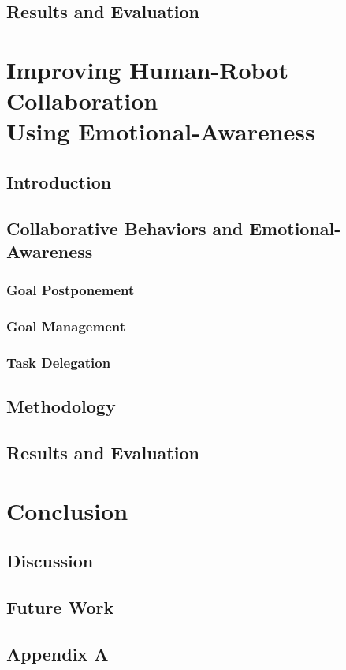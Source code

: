 \documentclass[12pt]{report}
\begin{document}
\section{Results and Evaluation}

\chapter{Improving Human-Robot Collaboration \\ Using Emotional-Awareness}
\label{ch:awareness}

\section{Introduction}

\section{Collaborative Behaviors and Emotional-Awareness}

\subsection{Goal Postponement}

\subsection{Goal Management}

\subsection{Task Delegation}

\section{Methodology}

\section{Results and Evaluation}

\chapter{Conclusion}
\label{ch:conclusion}

\section{Discussion}

\section{Future Work}

\pagebreak





\begin{appendices}
\chapter*{Appendix A}
\label{apdx:constraints}

\end{appendices}
\end{document}
